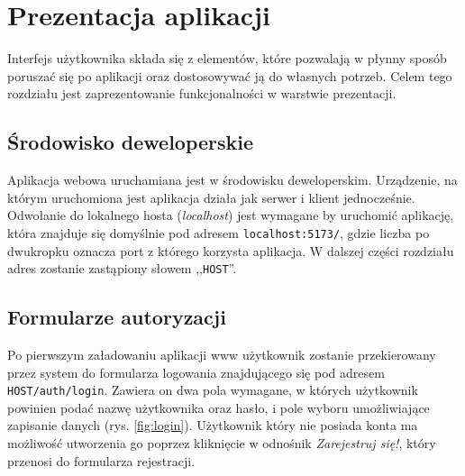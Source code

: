 \chapter{Prezentacja aplikacji}
Interfejs użytkownika składa się z elementów, które pozwalają w płynny sposób poruszać się po aplikacji oraz dostosowywać ją do własnych potrzeb. Celem tego rozdziału jest zaprezentowanie funkcjonalności w warstwie prezentacji.
\section{Środowisko deweloperskie}
Aplikacja webowa uruchamiana jest w środowisku deweloperskim. Urządzenie, na którym uruchomiona jest aplikacja działa jak serwer i klient jednocześnie. Odwołanie do lokalnego hosta (\textit{localhost}) jest wymagane by uruchomić aplikację, która znajduje się domyślnie pod adresem \texttt{localhost:5173/}, gdzie liczba po dwukropku oznacza port z którego korzysta aplikacja. W dalszej części rozdziału adres zostanie zastąpiony słowem ,,\texttt{HOST}''.

\section{Formularze autoryzacji}
Po pierwszym załadowaniu aplikacji www użytkownik zostanie przekierowany przez system do formularza logowania znajdującego się pod adresem \texttt{HOST/auth/login}. Zawiera on dwa pola wymagane, w których użytkownik powinien podać nazwę użytkownika oraz hasło, i pole wyboru umożliwiające zapisanie danych (rys. \ref{fig:login}). Użytkownik który nie posiada konta ma możliwość utworzenia go poprzez kliknięcie w odnośnik \textit{Zarejestruj się!}, który przenosi do formularza rejestracji.
